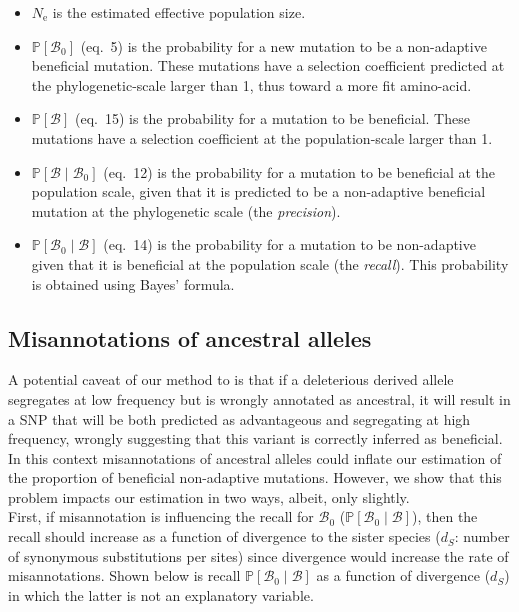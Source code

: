 \documentclass{article}
\newcommand{\Ne}{N_{\text{e}}}
\newcommand{\proba}{\mathbb{P}}
\newcommand{\ds}{d_S}
\newcommand{\SphyBen}{\mathcal{B}_0}
\newcommand{\given}{\mid}
\newcommand{\SpopBen}{\mathcal{B}}
\begin{document}
    \begin{itemize}
        \item $\Ne$ is the estimated effective population size.
        \item $\proba [ \SphyBen ]$ (eq.~5) is the probability for a new mutation to be a non-adaptive beneficial mutation.
        These mutations have a selection coefficient predicted at the phylogenetic-scale larger than 1, thus toward a more fit amino-acid.
        \item $\proba [ \SpopBen ]$ (eq.~15) is the probability for a mutation to be beneficial.
        These mutations have a selection coefficient at the population-scale larger than 1.
        \item $\proba [ \SpopBen \given \SphyBen]$ (eq.~12) is the probability for a mutation to be beneficial at the population scale, given that it is predicted to be a non-adaptive beneficial mutation at the phylogenetic scale (the \textit{precision}).
        \item $\proba [ \SphyBen \given \SpopBen]$ (eq.~14) is the probability for a mutation to be non-adaptive given that it is beneficial at the population scale (the \textit{recall}).
        This probability is obtained using Bayes' formula.
    \end{itemize}

    \newpage
    \subsection{Misannotations of ancestral alleles}

    A potential caveat of our method to is that if a deleterious derived allele segregates at low frequency but is wrongly annotated as ancestral, it will result in a SNP that will be both predicted as advantageous and segregating at high frequency, wrongly suggesting that this variant is correctly inferred as beneficial.
    In this context misannotations of ancestral alleles could inflate our estimation of the proportion of beneficial non-adaptive mutations.
    However, we show that this problem impacts our estimation in two ways, albeit, only slightly. \\

    First, if misannotation is influencing the recall for $\SphyBen$ ($\proba[\SphyBen\given \SpopBen ]$), then the recall should increase as a function of  divergence to the sister species ($\ds$: number of synonymous substitutions per sites) since divergence would increase the rate of misannotations.
    Shown below is recall $\proba[\SphyBen\given \SpopBen ]$ as a function of divergence ($\ds$) in which the latter is not an explanatory variable.
\end{document}
